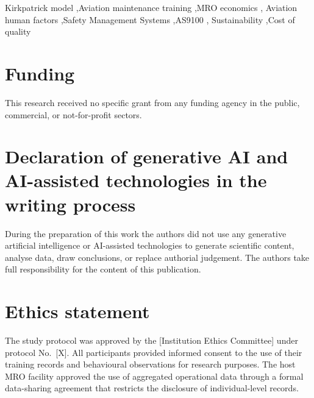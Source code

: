 \documentclass[a4paper,fleqn,oneside]{cas-dc}
\newcommand{\MRO}{MRO\xspace}
\begin{document}
\begin{keywords}
Kirkpatrick model \sep Aviation maintenance training \sep MRO economics \sep
Aviation human factors \sep Safety Management Systems \sep AS9100 \sep
Sustainability \sep Cost of quality
\end{keywords}

\maketitle











\section*{Funding}
This research received no specific grant from any funding agency in the
public, commercial, or not-for-profit sectors.

\section*{Declaration of generative AI and AI-assisted technologies in the writing process}
During the preparation of this work the authors did not use any generative
artificial intelligence or AI-assisted technologies to generate scientific
content, analyse data, draw conclusions, or replace authorial judgement.
The authors take full responsibility for the content of this publication.

\section*{Ethics statement}
The study protocol was approved by the [Institution Ethics Committee] under
protocol No.~[X]. All participants provided informed consent to the use of
their training records and behavioural observations for research purposes.
The host \MRO{} facility approved the use of aggregated operational data
through a formal data-sharing agreement that restricts the disclosure of
individual-level records.
\end{document}
